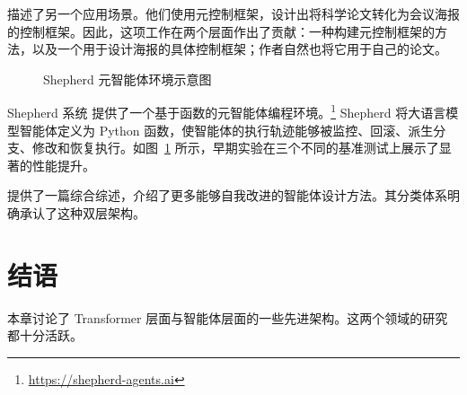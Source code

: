 \citet{luo2026autodesign} 描述了另一个应用场景。他们使用元控制框架，设计出将科学论文转化为会议海报的控制框架。因此，这项工作在两个层面作出了贡献：一种构建元控制框架的方法，以及一个用于设计海报的具体控制框架；作者自然也将它用于自己的论文。

\begin{figure}
    \centering
    
    \caption{Shepherd 元智能体环境示意图 \citep{yu2026shepherd}}
    \label{fig:shepherd}
\end{figure}

Shepherd 系统 \citep{yu2026shepherd} 提供了一个基于函数的元智能体编程环境。\footnote{\url{https://shepherd-agents.ai}} Shepherd 将大语言模型智能体定义为 Python 函数，使智能体的执行轨迹能够被监控、回滚、派生分支、修改和恢复执行。如图~\ref{fig:shepherd} 所示，早期实验在三个不同的基准测试上展示了显著的性能提升。

\citet{ren2026self} 提供了一篇综合综述，介绍了更多能够自我改进的智能体设计方法。其分类体系明确承认了这种双层架构。

\section{结语}
本章讨论了 Transformer 层面与智能体层面的一些先进架构。这两个领域的研究都十分活跃。





